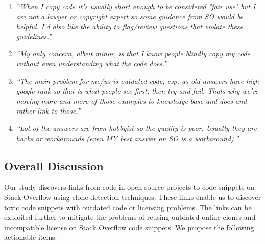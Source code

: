\documentclass[10pt,journal,compsoc]{IEEEtran}
\begin{document}
\begin{enumerate}
	\item \textit{``When I copy code it's usually short enough to be considered "fair
		use" but I am not a lawyer or copyright expert so some guidance from SO would be
		helpful. I'd also like the ability to flag/review questions that violate these
		guidelines.''}
	\item \textit{``My only concern, albeit minor, is that I know people blindly copy
		my code without even understanding what the code does.''}
	\item \textit{``The main problem for me/us is outdated code, esp. as old answers
		have high google rank so that is what people see first, then try and fail. Thats
		why we're moving more and more of those examples to knowledge base and docs and
		rather link to those.''}
	\item \textit{``Lot of the answers are from hobbyist so the quality is poor.
		Usually they are hacks or workarounds (even MY best answer on SO is a
		workaround).''}
\end{enumerate}

\subsection{Overall Discussion} %

Our study discovers links from code in open source projects to code snippets on
Stack Overflow using clone detection techniques. These links enable us to
discover toxic code snippets with outdated code or licensing problems. 
The links can be exploited further to mitigate the problems of reusing outdated online clones and
incompatible license on Stack Overflow code snippets. We propose the following
actionable items: 
\end{document}
